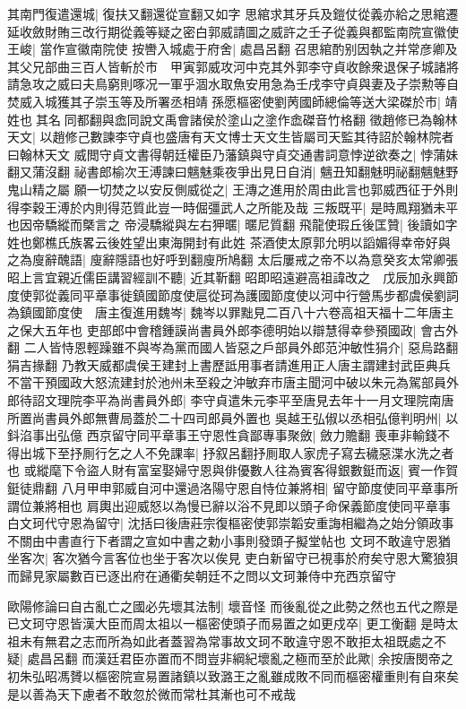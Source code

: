 其南門復遣還城|{
	復扶又翻還從宣翻又如字}
思綰求其牙兵及鎧仗從義亦給之思綰遷延收斂財賄三改行期從義等疑之密白郭威請圖之威許之壬子從義與都監南院宣徽使王峻|{
	當作宣徽南院使}
按轡入城處于府舍|{
	處昌呂翻}
召思綰酌别因執之并常彦卿及其父兄部曲三百人皆斬於市　甲寅郭威攻河中克其外郭李守貞收餘衆退保子城諸將請急攻之威曰夫鳥窮則啄况一軍乎涸水取魚安用急為壬戌李守貞與妻及子崇勲等自焚威入城獲其子崇玉等及所署丞相靖孫愿樞密使劉苪國師總倫等送大梁磔於市|{
	靖姓也其名同都翻與嵞同說文禹會諸侯於塗山之塗作嵞磔音竹格翻}
徵趙修已為翰林天文|{
	以趙修己數諫李守貞也盛唐有天文博士天文生皆屬司天監其待詔於翰林院者曰翰林天文}
威閲守貞文書得朝廷權臣乃藩鎮與守貞交通書詞意悖逆欲奏之|{
	悖蒲妹翻又蒲沒翻}
祕書郎榆次王溥諫曰魑魅乘夜爭出見日自消|{
	魑丑知翻魅明祕翻魑魅野鬼山精之屬}
願一切焚之以安反側威從之|{
	王漙之進用於周由此言也郭威西征于外則得李穀王溥於内則得范質此豈一時倔彊武人之所能及哉}
三叛既平|{
	是時鳳翔猶未平也因帝驕縱而槩言之}
帝浸驕縱與左右狎暱|{
	暱尼質翻}
飛龍使瑕丘後匡贊|{
	後讀如字姓也鄭樵氏族畧云後姓望出東海開封有此姓}
茶酒使太原郭允明以謟媚得幸帝好與之為廋辭醜語|{
	廋辭隱語也好呼到翻廋所鳩翻}
太后屢戒之帝不以為意癸亥太常卿張昭上言宜親近儒臣講習經訓不聽|{
	近其靳翻}
昭即昭遠避高祖諱改之　戊辰加永興節度使郭從義同平章事徙鎮國節度使扈從珂為護國節度使以河中行營馬步都虞侯劉詞為鎮國節度使　唐主復進用魏岑|{
	魏岑以罪黜見二百八十六卷高祖天福十二年唐主之保大五年也}
吏部郎中會稽鍾謨尚書員外郎李德明始以辯慧得幸參預國政|{
	會古外翻}
二人皆恃恩輕躁雖不與岑為黨而國人皆惡之戶部員外郎范沖敏性狷介|{
	惡烏路翻狷吉掾翻}
乃教天威都虞侯王建封上書歷詆用事者請進用正人唐主謂建封武臣典兵不當干預國政大怒流建封於池州未至殺之沖敏弃市唐主聞河中破以朱元為駕部員外郎待詔文理院李平為尚書員外郎|{
	李守貞遣朱元李平至唐見去年十一月文理院南唐所置尚書員外郎無曹局蓋於二十四司郎員外置也}
吳越王弘俶以丞相弘億判明州|{
	以鈄淊事出弘億}
西京留守同平章事王守恩性貪鄙專事聚斂|{
	斂力贍翻}
喪車非輸錢不得出城下至抒厠行乞之人不免課率|{
	抒叙呂翻抒厠取人家虎子寫去穢惡渫水洗之者也}
或縱麾下令盜人財有富室娶婦守恩與俳優數人往為賓客得銀數鋌而返|{
	賓一作賀鋌徒鼎翻}
八月甲申郭威自河中還過洛陽守恩自恃位兼將相|{
	留守節度使同平章事所謂位兼將相也}
肩輿出迎威怒以為慢已辭以浴不見即以頭子命保義節度使同平章事白文珂代守恩為留守|{
	沈括曰後唐莊宗復樞密使郭崇韜安重誨相繼為之始分領政事不關由中書直行下者謂之宣如中書之勅小事則發頭子擬堂帖也}
文珂不敢違守恩猶坐客次|{
	客次猶今言客位也坐于客次以俟見}
吏白新留守已視事於府矣守恩大驚狼狽而歸見家屬數百已逐出府在通衢矣朝廷不之問以文珂兼侍中充西京留守

歐陽修論曰自古亂亡之國必先壞其法制|{
	壞音怪}
而後亂從之此勢之然也五代之際是已文珂守恩皆漢大臣而周太祖以一樞密使頭子而易置之如更戍卒|{
	更工衡翻}
是時太祖未有無君之志而所為如此者蓋習為常事故文珂不敢違守恩不敢拒太祖既處之不疑|{
	處昌呂翻}
而漢廷君臣亦置而不問豈非綱紀壞亂之極而至於此歟|{
	余按唐閔帝之初朱弘昭馮贇以樞密院宣易置諸鎮以致潞王之亂雖成敗不同而樞密權重則有自來矣}
是以善為天下慮者不敢忽於微而常杜其漸也可不戒哉

